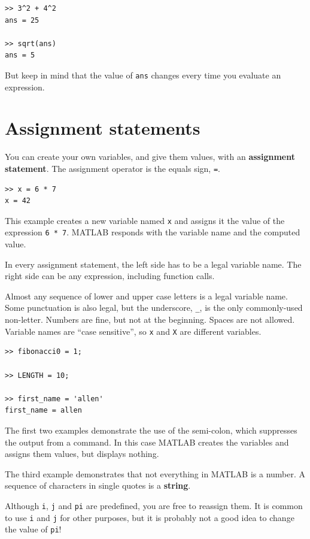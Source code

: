 \documentclass{book}
\begin{document}
\begin{verbatim}
>> 3^2 + 4^2
ans = 25

>> sqrt(ans)
ans = 5
\end{verbatim}

But keep in mind that the value of {\tt ans} changes every time
you evaluate an expression.


\section{Assignment statements}

You can create your own variables, and give them values, with
an {\bf assignment statement}.  The assignment operator is the
equals sign, {\tt =}.

\begin{verbatim}
>> x = 6 * 7
x = 42
\end{verbatim}

This example creates a new variable named {\tt x} and assigns it the
value of the expression {\tt 6 * 7}.  MATLAB responds with the
variable name and the computed value.

In every assignment statement, the left side has to be a
legal variable name.  The right side can be any expression,
including function calls.

Almost any sequence of lower and upper case letters is a legal
variable name.  Some punctuation is also legal, but the underscore,
{\tt \_}, is the only commonly-used non-letter.  Numbers are fine, but
not at the beginning.  Spaces are not allowed.  Variable names are
``case sensitive'', so {\tt x} and {\tt X} are different variables.

\begin{verbatim}
>> fibonacci0 = 1;

>> LENGTH = 10;

>> first_name = 'allen'
first_name = allen
\end{verbatim}

The first two examples demonstrate the use of the semi-colon, which
suppresses the output from a command.  In this case MATLAB creates the
variables and assigns them values, but displays nothing.

The third example demonstrates that not everything
in MATLAB is a number.  A sequence of characters in single quotes is
a {\bf string}.

Although {\tt i}, {\tt j} and {\tt pi} are predefined, you are free
to reassign them.  It is common to use {\tt i} and {\tt j} for other
purposes, but it is probably not a good idea to change the value of
{\tt pi}!
\end{document}
